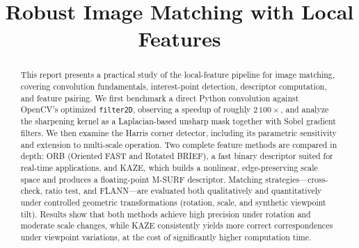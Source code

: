 \documentclass[conference]{IEEEtran}
\begin{document}
\title{Robust Image Matching with Local Features}

\author{
    \and
    \and
}

\maketitle

\begin{abstract}
This report presents a practical study of the local-feature pipeline for image matching, covering convolution fundamentals, interest-point detection, descriptor computation, and feature pairing. We first benchmark a direct Python convolution against OpenCV's optimized \texttt{filter2D}, observing a speedup of roughly $2\,100\times$, and analyze the sharpening kernel as a Laplacian-based unsharp mask together with Sobel gradient filters. We then examine the Harris corner detector, including its parametric sensitivity and extension to multi-scale operation. Two complete feature methods are compared in depth: ORB (Oriented FAST and Rotated BRIEF), a fast binary descriptor suited for real-time applications, and KAZE, which builds a nonlinear, edge-preserving scale space and produces a floating-point M-SURF descriptor. Matching strategies---cross-check, ratio test, and FLANN---are evaluated both qualitatively and quantitatively under controlled geometric transformations (rotation, scale, and synthetic viewpoint tilt). Results show that both methods achieve high precision under rotation and moderate scale changes, while KAZE consistently yields more correct correspondences under viewpoint variations, at the cost of significantly higher computation time.
\end{abstract}
\end{document}
